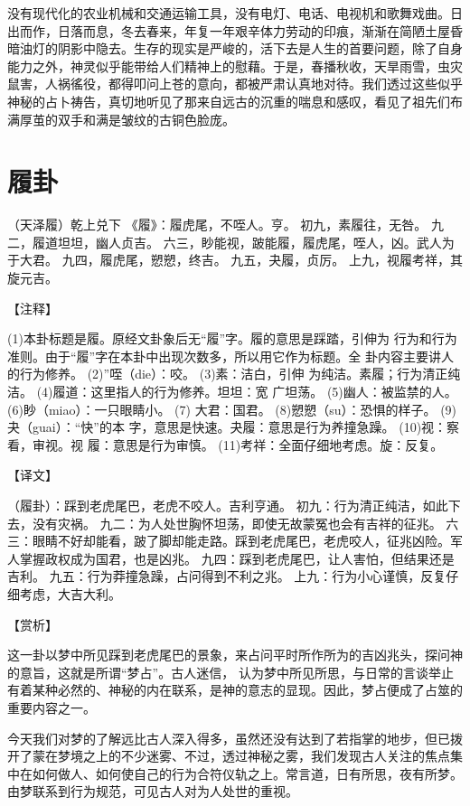 \documentclass[12pt,UTF8]{ctexbook}
\begin{document}
没有现代化的农业机械和交通运输工具，没有电灯、电话、电视机和歌舞戏曲。日出而作，日落而息，冬去春来，年复一年艰辛体力劳动的印痕，渐渐在简陋土屋昏暗油灯的阴影中隐去。生存的现实是严峻的，活下去是人生的首要问题，除了自身能力之外，神灵似乎能带给人们精神上的慰藉。于是，春播秋收，天旱雨雪，虫灾鼠害，人祸徭役，都得叩问上苍的意向，都被严肃认真地对待。我们透过这些似乎神秘的占卜祷告，真切地听见了那来自远古的沉重的喘息和感叹，看见了祖先们布满厚茧的双手和满是皱纹的古铜色脸庞。

\chapter{履卦}

（天泽履）乾上兑下
《履》：履虎尾，不咥人。亨。
初九，素履往，无咎。
九二，履道坦坦，幽人贞吉。
六三，眇能视，跛能履，履虎尾，咥人，凶。武人为于大君。
九四，履虎尾，愬愬，终吉。
九五，夬履，贞厉。
上九，视履考祥，其旋元吉。

【注释】

(1)本卦标题是履。原经文卦象后无“履”字。履的意思是踩踏，引伸为 行为和行为准则。由于“履”字在本卦中出现次数多，所以用它作为标题。全 卦内容主要讲人的行为修养。
(2)”咥（die）：咬。
(3)素：洁白，引伸 为纯洁。素履；行为清正纯洁。
(4)履道：这里指人的行为修养。坦坦：宽 广坦荡。
(5)幽人：被监禁的人。
(6)眇（miao）：一只眼睛小。
(7) 大君：国君。
(8)愬愬（su）：恐惧的样子。
(9)夬（guai）：“快”的本 字，意思是快速。夬履：意思是行为养撞急躁。
(10)视：察看，审视。视 履：意思是行为审慎。
(11)考祥：全面仔细地考虑。旋：反复。

【译文】

（履卦）：踩到老虎尾巴，老虎不咬人。吉利亨通。
初九：行为清正纯洁，如此下去，没有灾祸。
九二：为人处世胸怀坦荡，即使无故蒙冤也会有吉祥的征兆。
六三：眼睛不好却能看，跛了脚却能走路。踩到老虎尾巴，老虎咬人，征兆凶险。军人掌握政权成为国君，也是凶兆。
九四：踩到老虎尾巴，让人害怕，但结果还是吉利。
九五：行为莽撞急躁，占问得到不利之兆。
上九：行为小心谨慎，反复仔细考虑，大吉大利。

【赏析】

这一卦以梦中所见踩到老虎尾巴的景象，来占问平时所作所为的吉凶兆头，探问神的意旨，这就是所谓“梦占”。古人迷信， 认为梦中所见所思，与日常的言谈举止有着某种必然的、神秘的内在联系，是神的意志的显现。因此，梦占便成了占筮的重要内容之一。

今天我们对梦的了解远比古人深入得多，虽然还没有达到了若指掌的地步，但已拨开了蒙在梦境之上的不少迷雾、不过，透过神秘之雾，我们发现古人关注的焦点集中在如何做人、如何使自己的行为合符仪轨之上。常言道，日有所思，夜有所梦。由梦联系到行为规范，可见古人对为人处世的重视。
\end{document}

